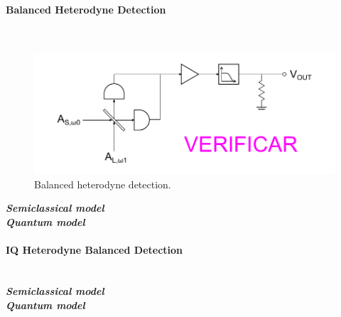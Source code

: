 \begin{bibunit}[plain]
\paragraph{Balanced Heterodyne Detection}\ \\
\begin{figure}[H]
	\centering
	\includegraphics{./sdf/optical_detection/figures/detection-balanced-heterodyne.pdf}
	\caption{Balanced heterodyne detection.}
\end{figure}


{\bf \em Semiclassical model}\\
{\bf \em Quantum model}\\


\paragraph{IQ Heterodyne Balanced Detection}\ \\


{\bf \em Semiclassical model}\\
{\bf \em Quantum model}\\



\end{bibunit}
